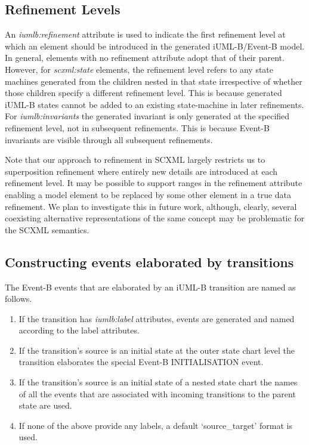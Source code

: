 \subsection{Refinement Levels}
An \emph{iumlb:refinement} attribute is used to indicate the first refinement 
level at which an element should be introduced in the generated iUML-B/Event-B model. 
In general, elements with no refinement attribute adopt that of their parent.  
However, for \emph{scxml:state} elements, the refinement level refers to any state 
machines generated from the children nested in that state irrespective of whether 
those children specify a different refinement level. This is because generated 
iUML-B states cannot be added to an existing state-machine in later refinements.
For \emph{iumlb:invariants} the generated invariant is only  generated at the 
specified refinement level, not in  subsequent refinements. This is because Event-B 
invariants are visible through all subsequent refinements.

Note that our approach to refinement in SCXML largely restricts us to superposition 
refinement where entirely new details are introduced at each refinement level.  
It may be possible to support ranges in the refinement attribute enabling a model 
element to be replaced by some other element in a true data refinement. We plan to 
investigate this in future work, although, clearly, several coexisting alternative 
representations of the same concept may be problematic for the SCXML semantics.

\subsection{Constructing events elaborated by transitions}
The Event-B events that are elaborated by an iUML-B  transition are named as follows. 

\vspace{-\topsep}
\begin{enumerate}
  \setlength{\parskip}{0pt}
  \setlength{\itemsep}{0pt plus 1pt}
\item If the transition has \emph{iumlb:label} attributes, events are generated 
and named according to the label attributes.
\item If the transition's source is an initial state at the outer state chart 
level the transition elaborates the special Event-B INITIALISATION event. 
\item If the transition's source is an initial state of a nested state chart 
the names of all the events that are associated with incoming transitions to 
the parent state are used.
\item If none of the above provide any labels, a default  `source\_target' format is used.
\end{enumerate}
\vspace{-\topsep}

